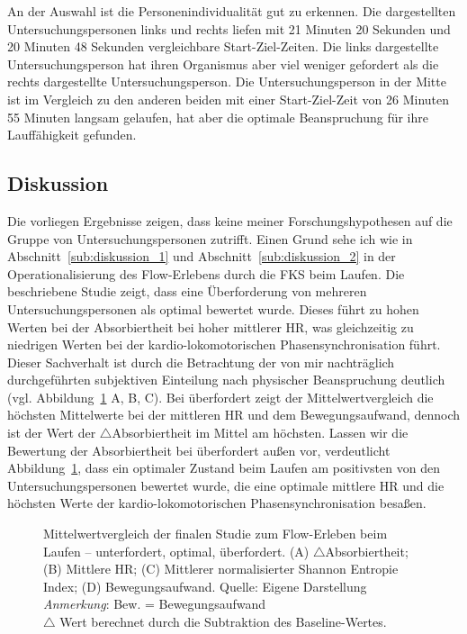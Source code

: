 An der Auswahl ist die Personenindividualität gut zu erkennen. Die dargestellten Untersuchungspersonen links und rechts liefen mit 21 Minuten 20 Sekunden und 20 Minuten 48 Sekunden vergleichbare Start-Ziel-Zeiten. Die links dargestellte Untersuchungsperson hat ihren Organismus aber viel weniger gefordert als die rechts dargestellte Untersuchungsperson. Die Untersuchungsperson in der Mitte ist im Vergleich zu den anderen beiden mit einer Start-Ziel-Zeit von 26 Minuten 55 Minuten langsam gelaufen, hat aber die optimale Beanspruchung für ihre Lauffähigkeit gefunden. 

\subsection{Diskussion}
\label{sub:diskussion_3}
Die vorliegen Ergebnisse zeigen, dass keine meiner Forschungshypothesen auf die Gruppe von Untersuchungspersonen zutrifft. Einen Grund sehe ich wie in Abschnitt~\ref{sub:diskussion_1} und Abschnitt~\ref{sub:diskussion_2} in der Operationalisierung des Flow-Erlebens durch die \ac{FKS} beim Laufen. Die beschriebene Studie zeigt, dass eine Überforderung von mehreren Untersuchungspersonen als optimal bewertet wurde. Dieses führt zu hohen Werten bei der Absorbiertheit bei hoher mittlerer \ac{HR}, was gleichzeitig zu niedrigen Werten bei der kardio-lokomotorischen Phasensynchronisation führt. Dieser Sachverhalt ist durch die Betrachtung der von mir nachträglich durchgeführten subjektiven Einteilung nach physischer Beanspruchung deutlich (vgl. Abbildung~\ref{fig:5_20_mittelwert_vergleich} A, B, C). Bei überfordert zeigt der Mittelwertvergleich die höchsten Mittelwerte bei der mittleren \ac{HR} und dem Bewegungsaufwand, dennoch ist der Wert der $\bigtriangleup$Absorbiertheit im Mittel am höchsten. Lassen wir die Bewertung der Absorbiertheit bei überfordert außen vor, verdeutlicht Abbildung~\ref{fig:5_20_mittelwert_vergleich}, dass ein optimaler Zustand beim Laufen am positivsten von den Untersuchungspersonen bewertet wurde, die eine optimale mittlere \ac{HR} und die höchsten Werte der kardio-lokomotorischen Phasensynchronisation besaßen.

\begin{figure}
	
	\caption[Mittelwertvergleich (Studie: Laufen)]{Mittelwertvergleich der finalen Studie zum Flow-Erleben beim Laufen -- unterfordert, optimal, überfordert. (A) $\bigtriangleup$Absorbiertheit; (B) Mittlere HR; (C) Mittlerer normalisierter Shannon Entropie Index; (D) Bewegungsaufwand. Quelle: Eigene Darstellung \\ \hspace{\textwidth}\emph{Anmerkung}: Bew. = Bewegungsaufwand\\ \hspace{\textwidth}$\bigtriangleup$ Wert berechnet durch die Subtraktion des Baseline-Wertes.}
	\label{fig:5_20_mittelwert_vergleich}
\end{figure}

